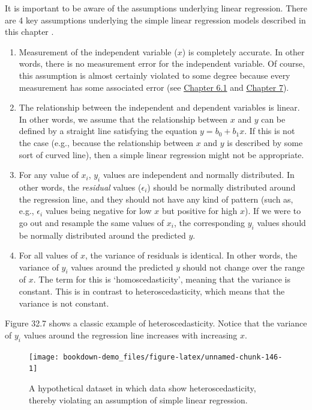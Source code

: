 \documentclass[
  openany]{scrbook}
\begin{document}
It is important to be aware of the assumptions underlying linear regression.
There are 4 key assumptions underlying the simple linear regression models described in this chapter \citep{Sokal1995}.

\begin{enumerate}
\def\labelenumi{\arabic{enumi}.}
\item
  Measurement of the independent variable (\(x\)) is completely accurate. In other words, there is no measurement error for the independent variable.
  Of course, this assumption is almost certainly violated to some degree because every measurement has some associated error (see \protect\hyperlink{accuracy}{Chapter 6.1} and \protect\hyperlink{Chapter_7}{Chapter 7}).
\item
  The relationship between the independent and dependent variables is linear.
  In other words, we assume that the relationship between \(x\) and \(y\) can be defined by a straight line satisfying the equation \(y = b_{0} + b_{1}x\).
  If this is not the case (e.g., because the relationship between \(x\) and \(y\) is described by some sort of curved line), then a simple linear regression might not be appropriate.
\item
  For any value of \(x_{i}\), \(y_{i}\) values are independent and normally distributed.
  In other words, the \emph{residual} values (\(\epsilon_{i}\)) should be normally distributed around the regression line, and they should not have any kind of pattern (such as, e.g., \(\epsilon_{i}\) values being negative for low \(x\) but positive for high \(x\)).
  If we were to go out and resample the same values of \(x_{i}\), the corresponding \(y_{i}\) values should be normally distributed around the predicted \(y\).
\item
  For all values of \(x\), the variance of residuals is identical.
  In other words, the variance of \(y_{i}\) values around the predicted \(y\) should not change over the range of \(x\).
  The term for this is `homoscedasticity', meaning that the variance is constant.
  This is in contrast to heteroscedasticity, which means that the variance is not constant.
\end{enumerate}

Figure 32.7 shows a classic example of heteroscedasticity.
Notice that the variance of \(y_{i}\) values around the regression line increases with increasing \(x\).

\begin{figure}
\texttt{[image: bookdown-demo\_files/figure-latex/unnamed-chunk-146-1]} \caption{A hypothetical dataset in which data show heteroscedasticity, thereby violating an assumption of simple linear regression.}\label{fig:unnamed-chunk-146}
\end{figure}
\end{document}

